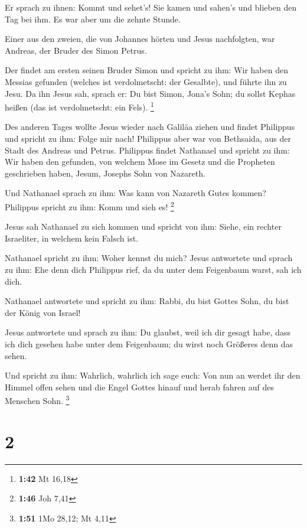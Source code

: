  Er sprach zu ihnen: Kommt und sehet's! Sie kamen und
sahen's und blieben den Tag bei ihm. Es war aber um die zehnte Stunde.

 Einer aus den zweien, die von Johannes hörten und Jesus
nachfolgten, war Andreas, der Bruder des Simon Petrus.

 Der findet am ersten seinen Bruder Simon und spricht zu
ihm: Wir haben den Messias gefunden (welches ist verdolmetscht: der
Gesalbte),  und führte ihn zu Jesu. Da ihn Jesus sah,
sprach er: Du bist Simon, Jona's Sohn; du sollst Kephas heißen (das ist
verdolmetscht: ein Fels). \footnote{\textbf{1:42} Mt 16,18}

 Des anderen Tages wollte Jesus wieder nach Galiläa ziehen
und findet Philippus und spricht zu ihm: Folge mir nach! 
Philippus aber war von Bethsaida, aus der Stadt des Andreas und Petrus.
 Philippus findet Nathanael und spricht zu ihm: Wir haben
den gefunden, von welchem Mose im Gesetz und die Propheten geschrieben
haben, Jesum, Josephs Sohn von Nazareth.

 Und Nathanael sprach zu ihm: Was kann von Nazareth Gutes
kommen? Philippus spricht zu ihm: Komm und sieh es! \footnote{\textbf{1:46}
  Joh 7,41}

 Jesus sah Nathanael zu sich kommen und spricht von ihm:
Siehe, ein rechter Israeliter, in welchem kein Falsch ist.

 Nathanael spricht zu ihm: Woher kennst du mich? Jesus
antwortete und sprach zu ihm: Ehe denn dich Philippus rief, da du unter
dem Feigenbaum warst, sah ich dich.

 Nathanael antwortete und spricht zu ihm: Rabbi, du bist
Gottes Sohn, du bist der König von Israel!

 Jesus antwortete und sprach zu ihm: Du glaubst, weil ich
dir gesagt habe, dass ich dich gesehen habe unter dem Feigenbaum; du
wirst noch Größeres denn das sehen.

 Und spricht zu ihm: Wahrlich, wahrlich ich sage euch: Von
nun an werdet ihr den Himmel offen sehen und die Engel Gottes hinauf und
herab fahren auf des Menschen Sohn. \footnote{\textbf{1:51} 1Mo 28,12;
  Mt 4,11}

\hypertarget{section-1}{%
\section{2}\label{section-1}}

